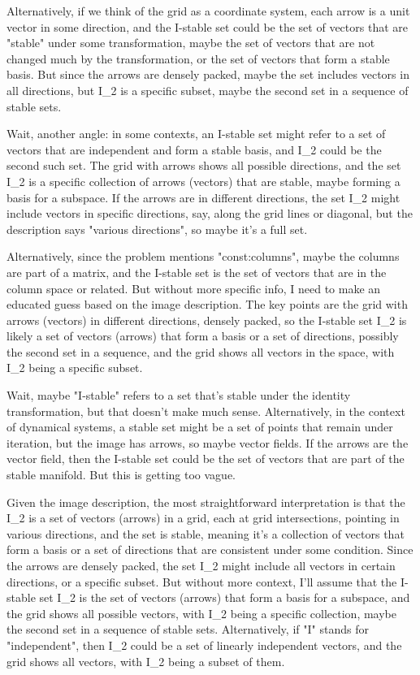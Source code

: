Alternatively, if we think of the grid as a coordinate system, each arrow is a unit vector in some direction, and the I-stable set could be the set of vectors that are "stable" under some transformation, maybe the set of vectors that are not changed much by the transformation, or the set of vectors that form a stable basis. But since the arrows are densely packed, maybe the set includes vectors in all directions, but I_2 is a specific subset, maybe the second set in a sequence of stable sets. 

Wait, another angle: in some contexts, an I-stable set might refer to a set of vectors that are independent and form a stable basis, and I_2 could be the second such set. The grid with arrows shows all possible directions, and the set I_2 is a specific collection of arrows (vectors) that are stable, maybe forming a basis for a subspace. If the arrows are in different directions, the set I_2 might include vectors in specific directions, say, along the grid lines or diagonal, but the description says "various directions", so maybe it's a full set. 

Alternatively, since the problem mentions "const:columns", maybe the columns are part of a matrix, and the I-stable set is the set of vectors that are in the column space or related. But without more specific info, I need to make an educated guess based on the image description. The key points are the grid with arrows (vectors) in different directions, densely packed, so the I-stable set I_2 is likely a set of vectors (arrows) that form a basis or a set of directions, possibly the second set in a sequence, and the grid shows all vectors in the space, with I_2 being a specific subset. 

Wait, maybe "I-stable" refers to a set that's stable under the identity transformation, but that doesn't make much sense. Alternatively, in the context of dynamical systems, a stable set might be a set of points that remain under iteration, but the image has arrows, so maybe vector fields. If the arrows are the vector field, then the I-stable set could be the set of vectors that are part of the stable manifold. But this is getting too vague. 

Given the image description, the most straightforward interpretation is that the I_2 is a set of vectors (arrows) in a grid, each at grid intersections, pointing in various directions, and the set is stable, meaning it's a collection of vectors that form a basis or a set of directions that are consistent under some condition. Since the arrows are densely packed, the set I_2 might include all vectors in certain directions, or a specific subset. But without more context, I'll assume that the I-stable set I_2 is the set of vectors (arrows) that form a basis for a subspace, and the grid shows all possible vectors, with I_2 being a specific collection, maybe the second set in a sequence of stable sets. Alternatively, if "I" stands for "independent", then I_2 could be a set of linearly independent vectors, and the grid shows all vectors, with I_2 being a subset of them. 

